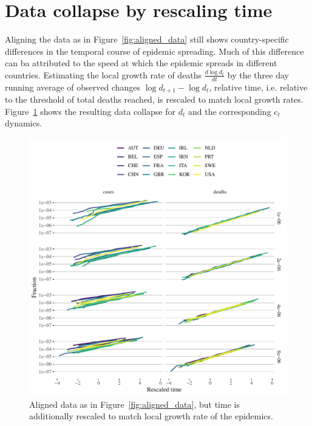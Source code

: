 \documentclass[fullpage,a4paper]{article}
\newcommand{\fig}[1]{Figure~\ref{fig:#1}}
\newcommand{\beginsupplement}{%
  \setcounter{table}{0}
  \renewcommand{\thetable}{S\arabic{table}}%
  \setcounter{figure}{0}
  \renewcommand{\thefigure}{S\arabic{figure}}%
}
\begin{document}



\clearpage

\appendix
\renewcommand\appendixname{Supplement}
\beginsupplement

\section{Data collapse by rescaling time}

Aligning the data as in \fig{aligned_data} still shows
country-specific differences in the temporal course of epidemic
spreading. Much of this difference can ba attributed to the speed at
which the epidemic spreads in different countries. Estimating the
local growth rate of deaths $\frac{d\log d_t}{dt}$ by the three day
running average of observed changes $\log d_{t+1} - \log d_t$,
relative time, i.e. relative to the threshold of total deaths reached,
is rescaled to match local growth rates. \fig{scaling} shows the
resulting data collapse for $d_t$ and the corresponding $c_t$ dynamics.
\begin{figure}
  \includegraphics[width=1\textwidth]{../figs/ecdc_scaling_all.pdf}
  \caption{\label{fig:scaling} Aligned data as in \fig{aligned_data},
    but time is additionally rescaled to match local growth rate of
    the epidemics.}
\end{figure}
\end{document}
